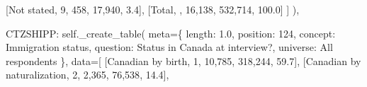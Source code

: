 \documentclass[
  11pt,
  a4paper,
]{article}
\newenvironment{Shaded}{\begin{snugshade}}{\end{snugshade}}
\newcommand{\NormalTok}[1]{\textcolor[rgb]{0.00,0.23,0.31}{#1}}
\newcommand{\OperatorTok}[1]{\textcolor[rgb]{0.37,0.37,0.37}{#1}}
\newcommand{\StringTok}[1]{\textcolor[rgb]{0.13,0.47,0.30}{#1}}
\newcommand{\VariableTok}[1]{\textcolor[rgb]{0.07,0.07,0.07}{#1}}
\begin{document}
\begin{Shaded}
\begin{Highlighting}[]
\NormalTok{                    [}\StringTok{\textquotesingle{}Not stated\textquotesingle{}}\NormalTok{, }\StringTok{\textquotesingle{}9\textquotesingle{}}\NormalTok{, }\StringTok{\textquotesingle{}458\textquotesingle{}}\NormalTok{, }\StringTok{\textquotesingle{}17,940\textquotesingle{}}\NormalTok{, }\StringTok{\textquotesingle{}3.4\textquotesingle{}}\NormalTok{],}
\NormalTok{                    [}\StringTok{\textquotesingle{}Total\textquotesingle{}}\NormalTok{, }\StringTok{\textquotesingle{}\textquotesingle{}}\NormalTok{, }\StringTok{\textquotesingle{}16,138\textquotesingle{}}\NormalTok{, }\StringTok{\textquotesingle{}532,714\textquotesingle{}}\NormalTok{, }\StringTok{\textquotesingle{}100.0\textquotesingle{}}\NormalTok{]}
\NormalTok{                ]}
\NormalTok{            ),}
            
            \StringTok{\textquotesingle{}CTZSHIPP\textquotesingle{}}\NormalTok{: }\VariableTok{self}\NormalTok{.\_create\_table(}
\NormalTok{                meta}\OperatorTok{=}\NormalTok{\{}
                    \StringTok{\textquotesingle{}length\textquotesingle{}}\NormalTok{: }\StringTok{\textquotesingle{}1.0\textquotesingle{}}\NormalTok{, }\StringTok{\textquotesingle{}position\textquotesingle{}}\NormalTok{: }\StringTok{\textquotesingle{}124\textquotesingle{}}\NormalTok{,}
                    \StringTok{\textquotesingle{}concept\textquotesingle{}}\NormalTok{: }\StringTok{\textquotesingle{}Immigration status\textquotesingle{}}\NormalTok{,}
                    \StringTok{\textquotesingle{}question\textquotesingle{}}\NormalTok{: }\StringTok{\textquotesingle{}Status in Canada at interview?\textquotesingle{}}\NormalTok{,}
                    \StringTok{\textquotesingle{}universe\textquotesingle{}}\NormalTok{: }\StringTok{\textquotesingle{}All respondents\textquotesingle{}}
\NormalTok{                \},}
\NormalTok{                data}\OperatorTok{=}\NormalTok{[}
\NormalTok{                    [}\StringTok{\textquotesingle{}Canadian by birth\textquotesingle{}}\NormalTok{, }\StringTok{\textquotesingle{}1\textquotesingle{}}\NormalTok{, }\StringTok{\textquotesingle{}10,785\textquotesingle{}}\NormalTok{, }\StringTok{\textquotesingle{}318,244\textquotesingle{}}\NormalTok{, }\StringTok{\textquotesingle{}59.7\textquotesingle{}}\NormalTok{],}
\NormalTok{                    [}\StringTok{\textquotesingle{}Canadian by naturalization\textquotesingle{}}\NormalTok{, }\StringTok{\textquotesingle{}2\textquotesingle{}}\NormalTok{, }\StringTok{\textquotesingle{}2,365\textquotesingle{}}\NormalTok{, }\StringTok{\textquotesingle{}76,538\textquotesingle{}}\NormalTok{, }\StringTok{\textquotesingle{}14.4\textquotesingle{}}\NormalTok{],}

\end{Highlighting}
\end{Shaded}
\end{document}
